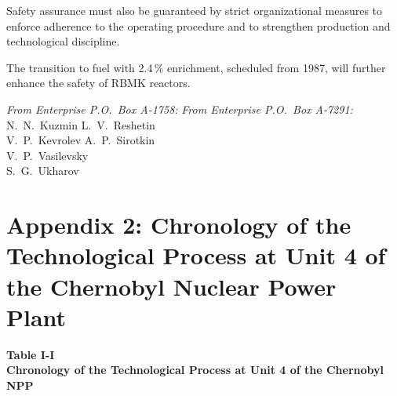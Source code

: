 \documentclass[openright]{bookest}
\begin{document}
Safety assurance must also be guaranteed by strict organizational measures to enforce adherence to the operating procedure and to strengthen production and technological discipline.

The transition to fuel with 2.4\,\% enrichment, scheduled from 1987, will further enhance the safety of RBMK reactors.

\medskip

\noindent\textit{From Enterprise P.O.~Box A-1758:} \hfill \textit{From Enterprise P.O.~Box A-7291:}\\
N.~N.~Kuzmin \hfill L.~V.~Reshetin\\
V.~P.~Kevrolev \hfill A.~P.~Sirotkin\\
\null\hfill V.~P.~Vasilevsky\\
\null\hfill S.~G.~Ukharov

\chapter*{Appendix 2: Chronology of the Technological Process at Unit 4 of the Chernobyl Nuclear Power Plant}

\begin{center}
\textbf{Table I-I}\\
\textbf{Chronology of the Technological Process at Unit 4 of the Chernobyl NPP}
\end{center}
\end{document}
